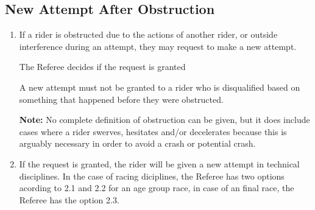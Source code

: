 \subsection{New Attempt After Obstruction\label{subsec:new_attempt}}

\begin{enumerate}[leftmargin=1.5em,labelsep=*]
  \item  If a rider is obstructed due to the actions of another rider, or outside interference during an attempt, 
  they may request to make a new attempt.

  The Referee decides if the request is granted

  A new attempt must not be granted to a rider who is disqualified based on something that happened before they were obstructed.

  {\textbf{Note:}} No complete definition of obstruction can be given, but it does include cases where a rider swerves, 
  hesitates and/or decelerates because this is arguably necessary in order to avoid a crash or potential crash.
  \item If the request is granted, the rider will be given a new attempt in technical disciplines. 
  In the case of racing diciplines, the Referee has two options acording to 2.1 and 2.2 for an age group race, 
  in case of an final race, the Referee has the option 2.3.


\end{enumerate}
